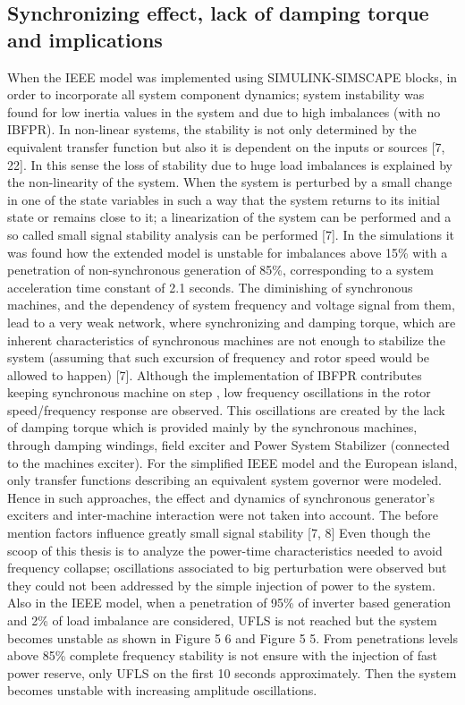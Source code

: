 \subsection{Synchronizing effect, lack of damping torque and implications}

When the IEEE model was implemented using SIMULINK-SIMSCAPE blocks, in order to incorporate all system component dynamics; system instability was found for low inertia values in the system and due to high imbalances (with no IBFPR). In non-linear systems, the stability is not only determined by the equivalent transfer function but also it is dependent on the inputs or sources [7, 22]. In this sense the loss of stability due to huge load imbalances is explained by the non-linearity of the system. When the system is perturbed by a small change in one of the state variables in such a way that the system returns to its initial state or remains close to it; a linearization of the system can be performed and a so called small signal stability analysis can be performed [7].
In the simulations it was found how the extended model is unstable for imbalances above 15\% with a penetration of non-synchronous generation of 85\%, corresponding to a system acceleration time constant of 2.1 seconds. The diminishing of synchronous machines, and the dependency of system frequency and voltage signal from them, lead to a very weak network, where synchronizing and damping torque, which are inherent characteristics of synchronous machines are not enough to stabilize the system (assuming that such excursion of frequency and rotor speed would be allowed to happen) [7]. Although the implementation of IBFPR contributes keeping synchronous machine on step , low frequency oscillations in the rotor speed/frequency response are observed. This oscillations are created by the lack of damping torque which is provided mainly by the synchronous machines, through damping windings, field exciter and Power System Stabilizer (connected to the machines exciter). For the simplified IEEE model and the European island, only transfer functions describing an equivalent system governor were modeled. Hence in such approaches, the effect and dynamics of synchronous generator’s exciters and inter-machine interaction were not taken into account. The before mention factors influence greatly small signal stability [7, 8]
Even though the scoop of this thesis is to analyze the power-time characteristics needed to avoid frequency collapse; oscillations associated to big perturbation were observed but they could not been addressed by the simple injection of power to the system. Also in the IEEE model, when a penetration of 95\% of inverter based generation and 2\% of load imbalance are considered, UFLS is not reached but the system becomes unstable as shown in Figure 5 6 and Figure 5 5. From penetrations levels above 85\% complete frequency stability is not ensure with the injection of fast power reserve, only UFLS on the first 10 seconds approximately. Then the system becomes unstable with increasing amplitude oscillations.
